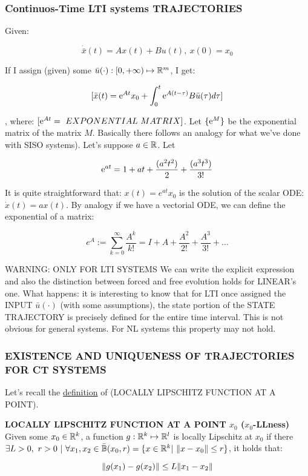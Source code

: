 \subsubsection{Continuos-Time LTI systems TRAJECTORIES}

Given:

\[
	\dot{\bar{x}}(t) = Ax(t) + Bu(t),\ x(0) = x_0
\]

If I assign (given) some $\bar{u}(\mathord{\cdot}) : [0, +\infty) \mapsto \mathbb{R}^m$, I get:

\begin{equation}
\label{ctsysevo}
[\bar{x}(t) = \mathop{}\!\mathrm{e}^{At}x_0 + \int_0^t{\mathop{}\!\mathrm{e}^{A(t-\tau)}B\bar{u}(\tau)d\tau}]
\end{equation}

, where: $[\e^{At} =\ EXPONENTIAL\ MATRIX]$. Let $\{\mathop{}\!\mathrm{e}^M\}$ be the exponential matrix of the matrix $M$. Basically there follows an analogy for what we've done with SISO systems). Let's suppose $a \in \mathbb{R}$. Let

\[
	\mathop{}\!\mathrm{e}^{at} = 1 + at + \frac{(a^2t^2)}{2} + \frac{(a^3t^3)}{3!}
\]

It is quite straightforward that: $x(t) = e^{at}x_0$ is the solution of the scalar ODE: $\dot{x}(t) = ax(t)$.
By analogy if we have a vectorial ODE, we can define the exponential of a matrix:

\begin{equation}
\label{ref:expdef}
	e^A := \sum_{k=0}^{\infty} \frac{A^k}{k!} = I + A + \frac{A^2}{2!} + \frac{A^3}{3!} + \dots
\end{equation}

WARNING: ONLY FOR LTI SYSTEMS We can write the explicit expression and also the distinction between forced and free evolution holds for LINEAR's one. What happens: it is interesting to know that for LTI once assigned the INPUT $\bar{u}(\mathord{\cdot})$ (with some assumptions), the state portion of the STATE TRAJECTORY is precisely defined for the entire time interval. This is not obvious for general systems. For NL systems this property may not hold.

\subsubsection{EXISTENCE AND UNIQUENESS OF TRAJECTORIES FOR CT SYSTEMS}

Let's recall the \underline{definition} of (LOCALLY LIPSCHITZ FUNCTION AT A POINT).

\begin{defn}{\textbf{LOCALLY LIPSCHITZ FUNCTION AT A POINT $x_0$ ($x_0$-LLness)}}
Given some $x_0 \in \mathbb{R}^k$, a function $g: \mathbb{R}^k \mapsto \mathbb{R}^l$ is locally Lipschitz at $x_0$ if there $\exists L > 0,\ r > 0\ |\ \forall x_1,x_2 \in \cball(x_0,r) = \{ x \in \R^k |\ \norma{x-x_0} \leq r \}$, it holds that:

\[
	\lVert g(x_1) - g(x_2)\rVert \leq L \lVert x_1 - x_2\rVert
\]

\end{defn}


